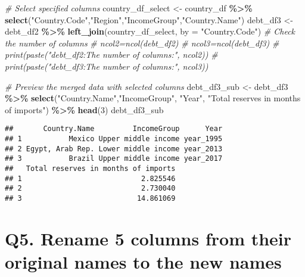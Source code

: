 \documentclass[
]{article}
\newenvironment{Shaded}{\begin{snugshade}}{\end{snugshade}}
\newcommand{\AttributeTok}[1]{\textcolor[rgb]{0.13,0.29,0.53}{#1}}
\newcommand{\CommentTok}[1]{\textcolor[rgb]{0.56,0.35,0.01}{\textit{#1}}}
\newcommand{\DecValTok}[1]{\textcolor[rgb]{0.00,0.00,0.81}{#1}}
\newcommand{\FunctionTok}[1]{\textcolor[rgb]{0.13,0.29,0.53}{\textbf{#1}}}
\newcommand{\NormalTok}[1]{#1}
\newcommand{\OtherTok}[1]{\textcolor[rgb]{0.56,0.35,0.01}{#1}}
\newcommand{\SpecialCharTok}[1]{\textcolor[rgb]{0.81,0.36,0.00}{\textbf{#1}}}
\newcommand{\StringTok}[1]{\textcolor[rgb]{0.31,0.60,0.02}{#1}}
\begin{document}
\begin{Shaded}
\begin{Highlighting}[]
\CommentTok{\# Select specified columns}
\NormalTok{country\_df\_select }\OtherTok{\textless{}{-}}\NormalTok{ country\_df }\SpecialCharTok{\%\textgreater{}\%}
  \FunctionTok{select}\NormalTok{(}\StringTok{"Country.Code"}\NormalTok{,}\StringTok{"Region"}\NormalTok{,}\StringTok{"IncomeGroup"}\NormalTok{,}\StringTok{"Country.Name"}\NormalTok{)}
\NormalTok{debt\_df3 }\OtherTok{\textless{}{-}}\NormalTok{ debt\_df2 }\SpecialCharTok{\%\textgreater{}\%}
  \FunctionTok{left\_join}\NormalTok{(country\_df\_select, }\AttributeTok{by =} \StringTok{"Country.Code"}\NormalTok{)}
\CommentTok{\# Check the number of columns}
\CommentTok{\# ncol2=ncol(debt\_df2)}
\CommentTok{\# ncol3=ncol(debt\_df3)}
\CommentTok{\# print(paste("debt\_df2:The number of columns:", ncol2))}
\CommentTok{\# print(paste("debt\_df3:The number of columns:", ncol3))}

\CommentTok{\# Preview the merged data with selected columns}
\NormalTok{debt\_df3\_sub }\OtherTok{\textless{}{-}}\NormalTok{ debt\_df3 }\SpecialCharTok{\%\textgreater{}\%}
  \FunctionTok{select}\NormalTok{(}\StringTok{"Country.Name"}\NormalTok{,}\StringTok{"IncomeGroup"}\NormalTok{, }\StringTok{"Year"}\NormalTok{, }\StringTok{"Total reserves in months of imports"}\NormalTok{) }\SpecialCharTok{\%\textgreater{}\%}
  \FunctionTok{head}\NormalTok{(}\DecValTok{3}\NormalTok{)}
\NormalTok{debt\_df3\_sub}
\end{Highlighting}
\end{Shaded}

\begin{verbatim}
##       Country.Name         IncomeGroup      Year
## 1           Mexico Upper middle income year_1995
## 2 Egypt, Arab Rep. Lower middle income year_2013
## 3           Brazil Upper middle income year_2017
##   Total reserves in months of imports
## 1                            2.825546
## 2                            2.730040
## 3                           14.861069
\end{verbatim}

\section{Q5. Rename 5 columns from their original names to the new
names}\label{q5.-rename-5-columns-from-their-original-names-to-the-new-names}
\end{document}

